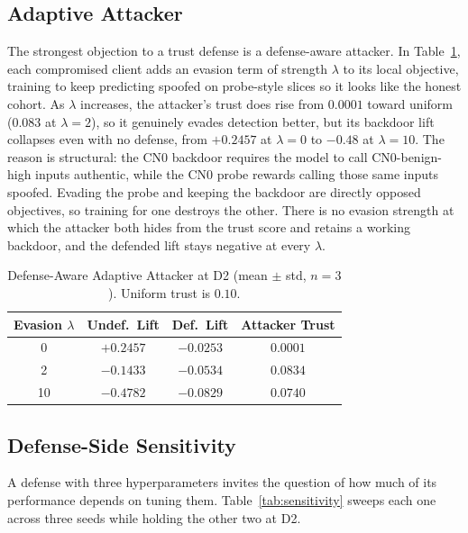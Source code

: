 \documentclass[journal]{IEEEtran}
\begin{document}
\subsection{Adaptive Attacker}
\label{subsec:adaptive}
The strongest objection to a trust defense is a defense-aware attacker. In Table~\ref{tab:adaptive}, each compromised client adds an evasion term of strength $\lambda$ to its local objective, training to keep predicting spoofed on probe-style slices so it looks like the honest cohort. As $\lambda$ increases, the attacker's trust does rise from $0.0001$ toward uniform ($0.083$ at $\lambda=2$), so it genuinely evades detection better, but its backdoor lift collapses even with no defense, from $+0.2457$ at $\lambda=0$ to $-0.48$ at $\lambda=10$. The reason is structural: the CN0 backdoor requires the model to call CN0-benign-high inputs authentic, while the CN0 probe rewards calling those same inputs spoofed. Evading the probe and keeping the backdoor are directly opposed objectives, so training for one destroys the other. There is no evasion strength at which the attacker both hides from the trust score and retains a working backdoor, and the defended lift stays negative at every $\lambda$.

\begin{table}[!t]
\renewcommand{\arraystretch}{1.25}
\caption{Defense-Aware Adaptive Attacker at D2 (mean $\pm$ std, $n=3$). Uniform trust is $0.10$.}
\label{tab:adaptive}
\centering
\footnotesize
\begin{tabular}{cccc}
\toprule
\textbf{Evasion $\lambda$} & \textbf{Undef.\ Lift} & \textbf{Def.\ Lift} & \textbf{Attacker Trust} \\
\midrule
0  & $+0.2457$ & $-0.0253$ & $0.0001$ \\
2  & $-0.1433$ & $-0.0534$ & $0.0834$ \\
10 & $-0.4782$ & $-0.0829$ & $0.0740$ \\
\bottomrule
\end{tabular}
\end{table}

\subsection{Defense-Side Sensitivity}
\label{subsec:sensitivity}
A defense with three hyperparameters invites the question of how much of its
performance depends on tuning them. Table~\ref{tab:sensitivity} sweeps each one across three seeds while holding
the other two at D2.
\end{document}
